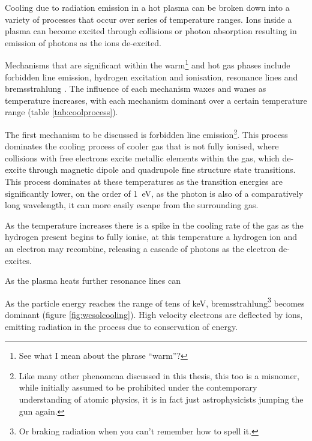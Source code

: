 
Cooling due to radiation emission in a hot plasma can be broken down into a variety of processes that occur over series of temperature ranges.
Ions inside a plasma can become excited through collisions or photon absorption resulting in emission of photons as the ions de-excited. 

Mechanisms that are significant within the warm\footnote{See what I mean about the phrase ``warm''?} and hot gas phases include forbidden line emission, hydrogen excitation and ionisation, resonance lines and bremsstrahlung \parencite{dysonPhysicsInterstellarMedium2021}.
The influence of each mechanism waxes and wanes as temperature increases, with each mechanism dominant over a certain temperature range (table \ref{tab:coolprocess}).


The first mechanism to be discussed is forbidden line emission\footnote{Like many other phenomena discussed in this thesis, this too is a misnomer, while initially assumed to be prohibited under the contemporary understanding of atomic physics, it is in fact just astrophysicists jumping the gun again.}.
This process dominates the cooling process of cooler gas that is not fully ionised, where collisions with free electrons excite metallic elements within the gas, which de-excite through magnetic dipole and quadrupole fine structure state transitions.
This process dominates at these temperatures as the transition energies are significantly lower, on the order of \SI{1}{\electronvolt}, as the photon is also of a comparatively long wavelength, it can more easily escape from the surrounding gas.


As the temperature increases there is a spike in the cooling rate of the gas as the hydrogen present begins to fully ionise, at this temperature a hydrogen ion and an electron may recombine, releasing a cascade of photons as the electron de-excites.


As the plasma heats further resonance lines can


As the particle energy reaches the range of tens of \si{\kilo\electronvolt}, bremsstrahlung\footnote{Or braking radiation when you can't remember how to spell it.} becomes dominant (figure \ref{fig:wcsolcooling}). High velocity electrons are deflected by ions, emitting radiation in the process due to conservation of energy. 

